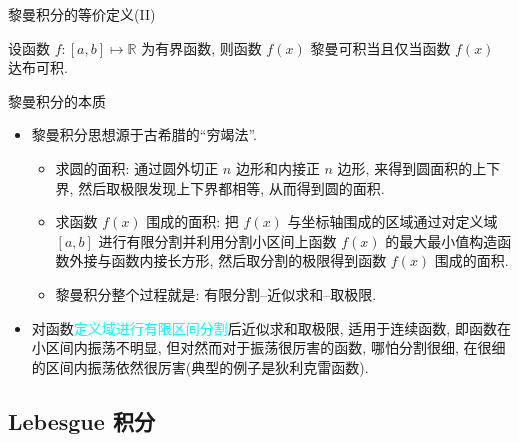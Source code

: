 \documentclass[Prob-All.tex]{subfiles}
\begin{document}
\begin{frame}{黎曼积分的等价定义(II)}

	\begin{thm}
		设函数 $f:[a,b]\mapsto \mathbb{R}$ 为有界函数, 则函数 $f(x)$ 黎曼可积当且仅当函数 $f(x)$ 达布可积.
	\end{thm}

\end{frame}
\begin{frame}{黎曼积分的本质}

	\begin{itemize}[<+-|alert@+>]
		\item 黎曼积分思想源于古希腊的“穷竭法”.
		\begin{itemize}[<+-|alert@+>]
			\item 求圆的面积: 通过圆外切正 $n$ 边形和内接正 $n$ 边形, 来得到圆面积的上下界, 然后取极限发现上下界都相等, 从而得到圆的面积.
			\item 求函数 $f(x)$ 围成的面积: 把 $f(x)$ 与坐标轴围成的区域通过对定义域 $[a,b]$ 进行有限分割并利用分割小区间上函数 $f(x)$ 的最大最小值构造函数外接与函数内接长方形, 然后取分割的极限得到函数 $f(x)$ 围成的面积.
			\item 黎曼积分整个过程就是: 有限分割--近似求和--取极限.
		\end{itemize}
		\item 对函数\textcolor{cyan}{定义域进行有限区间分割}后近似求和取极限, 适用于连续函数, 即函数在小区间内振荡不明显, 但对然而对于振荡很厉害的函数, 哪怕分割很细, 在很细的区间内振荡依然很厉害(典型的例子是狄利克雷函数).
	\end{itemize}

\end{frame}
\subsection{{\rm Lebesgue} 积分}
\end{document}
